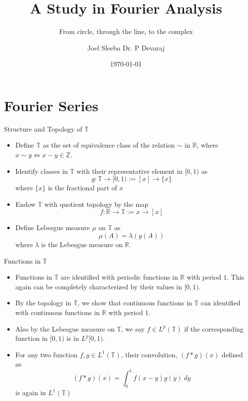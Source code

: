 \documentclass[compress]{beamer}
\title{A Study in Fourier Analysis}
\subtitle{From circle, through the line, to the complex}
\author[author1]{Joel Sleeba \hfill Dr. P Devaraj}
\institute{IISER Thiruvananthapuram \hfill Project Supervisor}
\date{\today}
\newcommand{\R}{\mathbb R}
\newcommand{\T}{\mathbb T}
\begin{document}
\begin{frame}
  \maketitle
\end{frame}


\section{Fourier Series}

\begin{frame}{Structure and Topology of $\mathbb{T}$}{}
  \begin{itemize}
    \item Define $\mathbb{T}$ as the set of equivalence class of the relation $\sim$ in $\R$, where $x\sim y \iff x-y \in \mathbb{Z}$. 
    \pause
  \item Identify classes in $\mathbb{T}$ with their representative element in $[0, 1)$ as
      \begin{equation}
        g: \T \to [0, 1) := [x] \to \{x\} 
        \label{eqn:identify_T_with_I}
      \end{equation}
    where $\{x\}$ is the fractional part of $x$
    \pause
    \item Endow $\mathbb{T}$ with quotient topology by the map 
      \begin{equation}
        f: \mathbb{R} \to \mathbb{T}:= x \to [x]
        \label{eqn:Topology_on_T}
      \end{equation}
    \pause
    \item Define Lebesgue measure $\mu$ on $\mathbb{T}$ as
      \begin{equation}
        \mu(A) = \lambda(g(A))
        \label{eq:measure_on_T}
      \end{equation}
      where $\lambda$ is the Lebesgue measure on $\R$.
  \end{itemize}
\end{frame}

\begin{frame}{Functions in $\T$}
  \begin{itemize}
    \item Functions in $\T$ are identified with periodic functions in $\R$ with period $1$. This again can be completely characterized by their values in $[0,1)$.
    \pause
    \item By the topology in $\T$, we show that continuous functions in $\T$ can identified with continuous functions in $\R$ with period $1$.
    \pause
    \item Also by the Lebesgue measure on $\T$, we say $f \in L^p(\T)$ if the corresponding function in $[0, 1)$ is in $L^p[0, 1)$.
    \pause
    \item For any two function $f, g \in L^1(\T)$, their convolution, $(f*g)(x)$ defined as
      \begin{equation}
        (f*g)(x) = \int_0^1 f(x-y)g(y) \ dy
        \label{eq:convolution_on_T}
      \end{equation}
    is again in $L^1(\T)$
  \end{itemize}
\end{frame}
\end{document}
